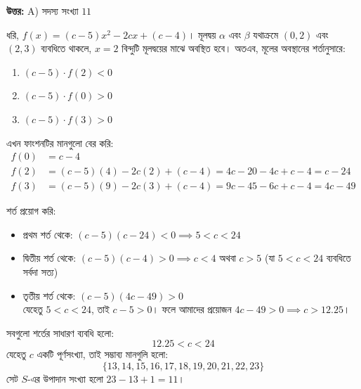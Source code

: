 \documentclass[12pt, a4paper]{article}
\begin{document}
\vspace{0.5em}
\begin{tcolorbox}[answerbox]
    \textbf{\color{success} উত্তর:} A) সদস্য সংখ্যা $11$
\end{tcolorbox}
\vspace{1em}

\begin{tcolorbox}[solutionbox={সমাধান (Solution)}]
    \noindent
    ধরি, $f(x) = (c-5)x^2 - 2cx + (c-4)$। মূলদ্বয় $\alpha$ এবং $\beta$ যথাক্রমে $(0, 2)$ এবং $(2, 3)$ ব্যবধিতে থাকলে, $x = 2$ বিন্দুটি মূলদ্বয়ের মাঝে অবস্থিত হবে। 
    অতএব, মূলের অবস্থানের শর্তানুসারে:
    \begin{enumerate}[itemsep=0.3em]
        \item $(c-5) \cdot f(2) < 0$
        \item $(c-5) \cdot f(0) > 0$
        \item $(c-5) \cdot f(3) > 0$
    \end{enumerate}
    
    \vspace{0.5em}
    এখন ফাংশনটির মানগুলো বের করি:
    \begin{align*}
        f(0) &= c - 4 \\
        f(2) &= (c-5)(4) - 2c(2) + (c-4) = 4c - 20 - 4c + c - 4 = c - 24 \\
        f(3) &= (c-5)(9) - 2c(3) + (c-4) = 9c - 45 - 6c + c - 4 = 4c - 49
    \end{align*}
    
    \vspace{0.5em}
    শর্ত প্রয়োগ করি:
    \begin{itemize}[itemsep=0.4em]
        \item প্রথম শর্ত থেকে: $(c-5)(c-24) < 0 \implies 5 < c < 24$
        \item দ্বিতীয় শর্ত থেকে: $(c-5)(c-4) > 0 \implies c < 4$ অথবা $c > 5$ (যা $5 < c < 24$ ব্যবধিতে সর্বদা সত্য)
        \item তৃতীয় শর্ত থেকে: $(c-5)(4c-49) > 0$ \\
        যেহেতু $5 < c < 24$, তাই $c-5 > 0$। ফলে আমাদের প্রয়োজন $4c-49 > 0 \implies c > 12.25$।
    \end{itemize}
    
    \vspace{0.5em}
    সবগুলো শর্তের সাধারণ ব্যবধি হলো:
    \[ 12.25 < c < 24 \]
    যেহেতু $c$ একটি পূর্ণসংখ্যা, তাই সম্ভাব্য মানগুলি হলো: 
    \[ \{13, 14, 15, 16, 17, 18, 19, 20, 21, 22, 23\} \]
    সেট $S$-এর উপাদান সংখ্যা হলো $23 - 13 + 1 = 11$।
\end{tcolorbox}
\end{document}
